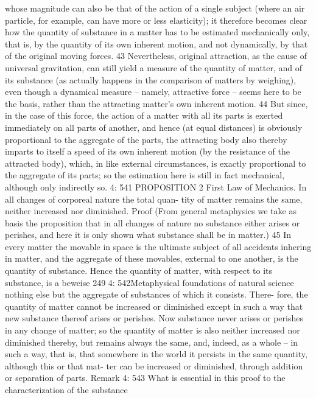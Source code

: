 whose magnitude can also be that of the action of a single subject (where
an air particle, for example, can have more or less elasticity); it therefore
becomes clear how the quantity of substance in a matter has to be
estimated mechanically only, that is, by the quantity of its own inherent
motion, and not dynamically, by that of the original moving forces. 43
Nevertheless, original attraction, as the cause of universal gravitation,
can still yield a measure of the quantity of matter, and of its substance
(as actually happens in the comparison of matters by weighing), even
though a dynamical measure – namely, attractive force – seems here to
be the basis, rather than the attracting matter’s own inherent motion. 44
But since, in the case of this force, the action of a matter with all its
parts is exerted immediately on all parts of another, and hence (at equal
distances) is obviously proportional to the aggregate of the parts, the
attracting body also thereby imparts to itself a speed of its own inherent
motion (by the resistance of the attracted body), which, in like external
circumstances, is exactly proportional to the aggregate of its parts; so the
estimation here is still in fact mechanical, although only indirectly so.
4: 541
PROPOSITION 2
First Law of Mechanics. In all changes of corporeal nature the total quan-
tity of matter remains the same, neither increased nor diminished.
Proof
(From general metaphysics we take as basis the proposition that in all
changes of nature no substance either arises or perishes, and here it is only
shown what substance shall be in matter.) 45 In every matter the movable
in space is the ultimate subject of all accidents inhering in matter, and the
aggregate of these movables, external to one another, is the quantity of
substance. Hence the quantity of matter, with respect to its substance, is
a
beweise
249
4: 542Metaphysical foundations of natural science
nothing else but the aggregate of substances of which it consists. There-
fore, the quantity of matter cannot be increased or diminished except in
such a way that new substance thereof arises or perishes. Now substance
never arises or perishes in any change of matter; so the quantity of matter
is also neither increased nor diminished thereby, but remains always the
same, and, indeed, as a whole – in such a way, that is, that somewhere
in the world it persists in the same quantity, although this or that mat-
ter can be increased or diminished, through addition or separation of
parts.
Remark
4: 543
What is essential in this proof to the characterization of the substance
